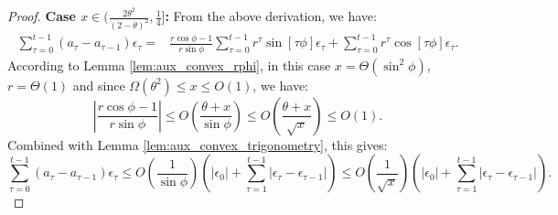 \begin{proof}
\noindent \textbf{Case $x \in (\frac{2\theta^2}{(2-\theta)^2}, \frac{1}{4}]$:}
From the above derivation, we have:
\begin{align*}
\sum_{\tau = 0}^{t-1} (a_\tau - a_{\tau-1})  \epsilon_\tau
=& \frac{r\cos\phi - 1}{r\sin\phi} \sum_{\tau =0}^{t-1}r^{\tau}\sin[\tau\phi]\epsilon_\tau  + \sum_{\tau =0}^{t-1}r^{\tau}\cos[\tau\phi]\epsilon_\tau.
\end{align*}
According to Lemma \ref{lem:aux_convex_rphi}, in this case $ x = \Theta(\sin^2\phi)$, $r = \Theta(1)$ and since $\Omega(\theta^2)\le x \le O(1)$, we have:
\begin{equation*}
\left|\frac{r\cos\phi - 1}{r\sin\phi}\right|
\le O\left(\frac{\theta + x}{\sin\phi}\right)
\le O\left(\frac{\theta + x}{\sqrt{x}}\right) \le O(1).
\end{equation*}
Combined with Lemma \ref{lem:aux_convex_trigonometry}, this gives:
\begin{equation*}
\sum_{\tau = 0}^{t-1} (a_\tau - a_{\tau-1})  \epsilon_\tau
\le O(\frac{1}{\sin\phi})\left(|\epsilon_0| + \sum_{\tau = 1}^{t-1}|\epsilon_\tau - \epsilon_{\tau -1}|\right)
\le O(\frac{1}{\sqrt{x}})\left(|\epsilon_0| 
+ \sum_{\tau = 1}^{t-1}|\epsilon_\tau - \epsilon_{\tau -1}|\right).
\end{equation*}


\end{proof}
